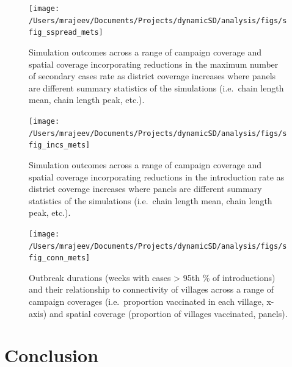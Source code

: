 \documentclass[
  oneside]{book}
\begin{document}
\begin{figure}
\texttt{[image: /Users/mrajeev/Documents/Projects/dynamicSD/analysis/figs/sfig\_sspread\_mets]} \caption[Simulation outcomes across a range of campaign coverage and spatial coverage.]{Simulation outcomes across a range of campaign coverage and spatial coverage incorporating reductions in the maximum number of secondary cases rate as district coverage increases where panels are different summary statistics of the simulations (i.e.~chain length mean, chain length peak, etc.).}\label{fig:sfig-sspread-mets}
\end{figure}



\begin{figure}
\texttt{[image: /Users/mrajeev/Documents/Projects/dynamicSD/analysis/figs/sfig\_incs\_mets]} \caption{Simulation outcomes across a range of campaign coverage and spatial coverage incorporating reductions in the introduction rate as district coverage increases where panels are different summary statistics of the simulations (i.e.~chain length mean, chain length peak, etc.).}\label{fig:sfig-incs-mets}
\end{figure}



\begin{figure}
\texttt{[image: /Users/mrajeev/Documents/Projects/dynamicSD/analysis/figs/sfig\_conn\_mets]} \caption{Outbreak durations (weeks with cases \textgreater{} 95th \% of introductions) and their relationship to connectivity of villages across a range of campaign coverages (i.e.~proportion vaccinated in each village, x-axis) and spatial coverage (proportion of villages vaccinated, panels).}\label{fig:sfig-conn-mets}
\end{figure}



\hypertarget{conclusion-1}{%
\chapter{Conclusion}\label{conclusion-1}}

\setlength{\parskip}{2em}
\end{document}
